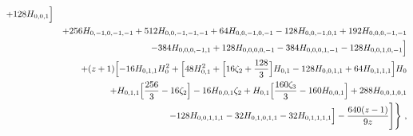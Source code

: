 \begin{eqnarray}
+128 H_{0,0,1}\Bigr]
\nonumber\\&&
+256 H_{0,-1,0,-1,-1}
+512 H_{0,0,-1,-1,-1}+64
H_{0,0,-1,0,-1}
-128 H_{0,0,-1,0,1}+192 H_{0,0,0,-1,-1}
\nonumber\\&&
-384 H_{0,0,0,-1,1}+128 H_{0,0,0,0,-1}
-384 H_{0,0,0,1,-1}-128 H_{0,0,1,0,-1}\Bigr]
\nonumber\\&&
+(z+1) \Bigl[-16 H_{0,1,1} H_0^2+\Bigl[48 H_{0,1}^2+\Bigl[16 \zeta_2+\frac{128 }{3}\Bigr] H_{0,1}-128 H_{0,0,1,1}+64 H_{0,1,1,1}\Bigr] H_0
\nonumber\\&&
+H_{0,1,1} \Bigl[\frac{256 }{3}-16 \zeta_2\Bigr]-16 H_{0,0,1}
\zeta_2+H_{0,1} \Bigl[\frac{160 \zeta_3}{3}-160 H_{0,0,1}\Bigr]+288
H_{0,0,1,0,1}
\nonumber\\&&
-128 H_{0,0,1,1,1}-32 H_{0,1,0,1,1}-32 H_{0,1,1,1,1}\Bigr]-\frac{640 
  (z-1)}{9 z}\Biggr]
 \Biggr\}~,
\end{eqnarray}
